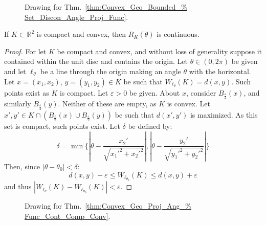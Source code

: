 \documentclass[crop=false,class=book,oneside]{standalone}
\begin{document}
            \begin{figure}[H]
                \centering
                \captionsetup{type=figure}
                
                \caption{Drawing for Thm.~\ref{thm:Convex_Geo_Bounded_%
                    Set_Discon_Angle_Proj_Func}.}
                \label{fig:Convex_Geo_Bounded_Set_Discon_Angle_Func}
            \end{figure}
            \begin{theorem}
                \label{thm:Convex_Geo_Proj_Ang_Func_Cont_Comp_Conv}
                If $K\subset\mathbb{R}^2$ is compact and convex,
                then $R_K(\theta)$ is continuous.
            \end{theorem}
            \begin{proof}
                For let $K$ be compact and convex, and without loss
                of generality suppose it contained within the unit disc
                and contains the origin. Let $\theta\in (0,2\pi)$ be
                given and let $\ell_{\theta}$ be a line through the
                origin making an angle $\theta$ with the horizontal.
                Let $x=(x_1,x_2)$, $y=(y_1,y_2)\in{K}$ be such that
                $W_{\ell_{\theta}}(K)=d(x,y)$. Such points exist as
                $K$ is compact. Let $\varepsilon>0$ be given. About $x$,
                consider $B_{\frac{\varepsilon}{2}}(x)$, and similarly
                $B_{\frac{\varepsilon}{2}}(y)$. Neither of these are
                empty, as $K$ is convex. Let $x',y'\in K\cap(B_{\frac{\varepsilon}{2}}(x)\cup B_{\frac{\varepsilon}{2}}(y))$ be such that $d(x',y')$
                is maximized. As this set is compact, such points exist.
                Let $\delta$ be defined by:
                \begin{equation}
                    \delta=
                    \min\{|\theta-\frac{x_2'}{\sqrt{x_1'^2+x_2'^2}}|,
                        |\theta-\frac{y_2'}{\sqrt{y_1'^2+y_2'^2}}|\}
                \end{equation}
                Then, since $|\theta-\theta_0|<\delta$:
                \begin{equation}
                    d(x,y)-\varepsilon\leq
                    W_{\ell_{\theta_0}}(K)\leq
                    d(x,y)+\varepsilon
                \end{equation}
                and thus $|W_{\ell_\theta}(K)-W_{\ell_{\theta_0}}(K)|< \varepsilon$.
            \end{proof}
            \begin{figure}
                \centering
                \captionsetup{type=figure}
                
                \caption{Drawing for Thm.~\ref{thm:Convex_Geo_Proj_Ang_%
                    Func_Cont_Comp_Conv}.}
                \label{fig:Convex_Geo_Proj_Ang_Func_Cont_Comp_Conv}
            \end{figure}
\end{document}
